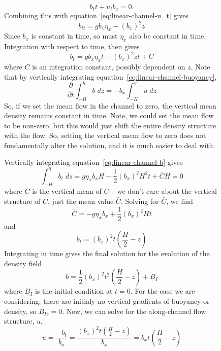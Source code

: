 \documentclass[11pt]{report}
\numberwithin{equation}{section}
\begin{document}
\begin{figure}
\begin{equation}
    b_tt + u_t b_x = 0.
\end{equation}
Combining this with equation~\ref{eq:linear-channel-u_t} gives
\begin{equation}
    b_{tt} = g b_x \eta_x - (b_x)^2 z
\end{equation}
Since $b_x$ is constant in time, so must $\eta_x$ also be constant in time.  Integration with respect to time, then gives
\begin{equation}
    \label{eq:linear-channel-b}
    b_t = g b_x \eta_x t - (b_x)^2 z t + C
\end{equation}
where $C$ is an integration constant, possibly dependent on $z$.  Note that by vertically integrating equation~\ref{eq:linear-channel-buoyancy},
\begin{equation}
    \frac{\partial}{\partial t} \int_{-H}^\eta b\;dz = - b_x \int_{-H}^\eta u\;dz
\end{equation}
So, if we set the mean flow in the channel to zero, the vertical mean density remains constant in time.  Note, we could set the mean flow to be non-zero, but this would just shift the entire density structure with the flow.  So, setting the vertical mean flow to zero does not fundamentally alter the solution, and it is much easier to deal with.

Vertically integrating equation~\ref{eq:linear-channel-b} gives
\begin{equation}
    \int_{-H}^\eta b_t\;dz = g \eta_x b_x H - \frac{1}{2}(b_x)^2 H^2 t + \bar{C} H = 0
\end{equation}
where $\bar{C}$ is the vertical mean of $C$ -- we don't care about the vertical structure of $C$, just the mean value $\bar{C}$.  Solving for $\bar{C}$, we find
\begin{equation}
    \bar{C} = -g \eta_x b_x + \frac{1}{2} (b_x)^2 H t
\end{equation}
and
\begin{equation}
    b_t = (b_x)^2 t \left( \frac{H}{2} - z \right)
\end{equation}
Integrating in time gives the final solution for the evolution of the density field
\begin{equation}
    b = \frac{1}{2}(b_x)^2 t^2 \left( \frac{H}{2} - z \right) + B_I
\end{equation}
where $B_I$ is the initial condition at $t=0$.  For the case we are considering, there are initialy no vertical gradients of buoyancy or density, so $B_{Iz} = 0$.  Now, we can solve for the along-channel flow structure, $u$,
\begin{equation}
    u = \frac{-b_t}{b_x} = \frac{(b_x)^2 t \left( \frac{H}{2} - z \right)}{b_x}
         = b_x t \left( \frac{H}{2} - z \right)
\end{equation}


\end{figure}
\end{document}
